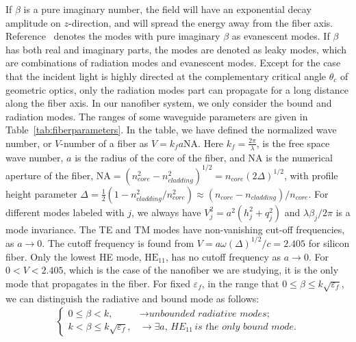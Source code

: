 If $ \beta $ is a pure imaginary number, the field will have an exponential decay amplitude on $ z $-direction, and will spread the energy away from the fiber axis. Reference~\cite{Snyder1983} denotes the modes with pure imaginary $ \beta $ as evanescent modes. If $ \beta $ has both real and imaginary parts, the modes are denoted as leaky modes, which are combinations of radiation modes and evanescent modes. Except for the case that the incident light is highly directed at the complementary critical angle $ \theta_c $ of geometric optics, only the radiation modes part can propagate for a long distance along the fiber axis. In our nanofiber system, we only consider the bound and radiation modes. The ranges of some waveguide parameters are given in Table~\ref{tab:fiberparameters}. 
In the table, we have defined the normalized wave number\cite{Snyder1983}, or 
$V$-number 
of a fiber as $V  = 
k_f a \mathrm{NA}$.  Here $k_f=\frac{2\pi}{\lambda}$, is the free space wave number, $a$ is the radius 
of the core of the fiber, and $\mathrm{NA}$ is the numerical aperture of 
the fiber, $\mathrm{NA} = 
(n_{core}^2 - n_{cladding}^2)^{1/2} = n_{core}(2\Delta)^{1/2}$, with profile height 
parameter 
$\Delta =\frac{1}{2}(1-n_{cladding}^2/n_{core}^2)\approx (n_{core}-n_{cladding})/n_{core}$.  For 
different modes labeled with $ j $, we always have $V_j^2=a^2(h_j^2+q_j^2)$ and $ \lambda\beta_j/2\pi $ is a mode invariance.  The TE and TM modes have non-vanishing cut-off 
frequencies, as $ a\rightarrow 0 $.  The cutoff frequency is found from $V = a\omega (\Delta)^{1/2}/c =2.405$ for silicon fiber.  
Only the lowest HE mode, $\mathrm{HE}_{11}$, has no cutoff frequency as $ a\rightarrow 0 $.  For $0 < V < 2.405$, which is the case of the nanofiber we are studying, it is the only mode that propagates in the 
fiber. For fixed $ \varepsilon_f $, in the range that $ 0\leq \beta \leq 
k\sqrt{\varepsilon_f} $, we can distinguish the radiative and bound mode as follows:
\begin{align}
\begin{cases}
0\leq \beta < k, &\rightarrow \textit{unbounded radiative modes;}\\
k< \beta \leq k \sqrt{\varepsilon_f}, &\rightarrow \exists a,\, \textit{HE}_{11}\, \textit{is the only 
bound mode.}
\end{cases}
\end{align}


